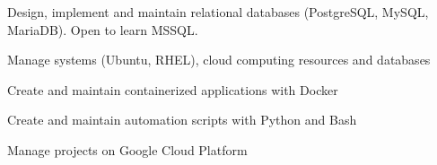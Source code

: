 

\begin{cvskills}

  \begin{minipage}[t]{0.45\textwidth}
    \cvskill
      {Design, implement and maintain relational databases (PostgreSQL, MySQL, MariaDB). Open to learn MSSQL.}
  \end{minipage}\hfill
  \begin{minipage}[t]{0.45\textwidth}
    \cvskill
      {Manage systems (Ubuntu, RHEL), cloud computing resources and databases}
  \end{minipage}

  \begin{minipage}[t]{0.45\textwidth}
    \cvskill
      {Create and maintain containerized applications with Docker}
  \end{minipage}\hfill
  \begin{minipage}[t]{0.45\textwidth}
    \cvskill
      {Create and maintain automation scripts with Python and Bash}
  \end{minipage}

  \begin{minipage}[t]{0.45\textwidth}
    \cvskill
      {Manage projects on Google Cloud Platform}
  \end{minipage}\hfill
  \begin{minipage}[t]{0.45\textwidth}
    
  \end{minipage}

\end{cvskills}
